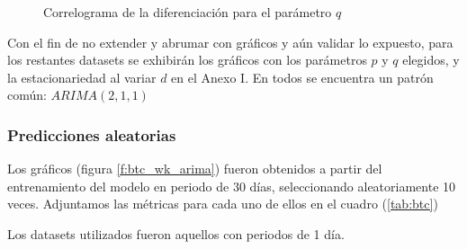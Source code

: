 \documentclass[a4paper,10pt]{article}
\begin{document}
\begin{figure}[h!]
 \centering
  \caption{Correlograma de la diferenciación para el parámetro $q$}
  \label{f:fac_btc_q}
\end{figure}

Con el fin de no extender y abrumar con gráficos y aún validar lo expuesto, para los restantes datasets se exhibirán los gráficos con los parámetros $p$ y $q$ elegidos, y la estacionariedad al variar $d$ en el Anexo I. En todos se encuentra un patrón común: $ARIMA(2,1,1)$

\subsubsection{Predicciones aleatorias}

Los gráficos (figura \ref{f:btc_wk_arima}) fueron obtenidos a partir del entrenamiento del modelo en periodo de 30 días, seleccionando aleatoriamente 10 veces. Adjuntamos las métricas para cada uno de ellos en el cuadro (\ref{tab:btc})

Los datasets utilizados fueron aquellos con periodos de 1 día.
\end{document}

